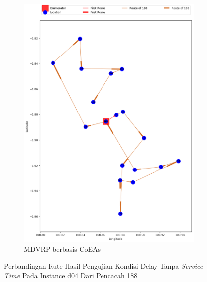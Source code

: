 \begin{figure}[H]
	\centering
	\begin{subfigure}[t]{\textwidth}
		\centering
		\includegraphics[width=\textwidth]{Resources/Images/delayed_4/real_m15_n100_delayed_4_188_coes}
		\caption{MDVRP berbasis CoEAs}
		\label{fig:real_m15_n100_delayed_4_188_coes}
	\end{subfigure}
	\caption{Perbandingan Rute Hasil Pengujian Kondisi Delay Tanpa \textit{Service Time} Pada Instance d04 Dari Pencacah 188}
	\label{fig:real_m15_n100_delayed_4_188}
\end{figure}


